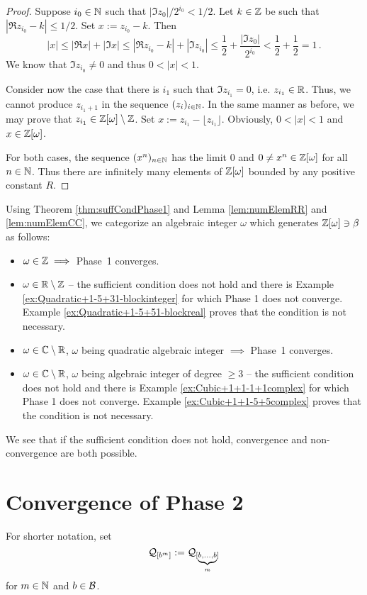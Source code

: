 \begin{proof}
Suppose $i_0\in\mathbb{N}$ such that $|\Im z_0|/2^{i_0}< 1/2$. Let $k\in\mathbb{Z}$ be such that $|\Re z_{i_0} -k|\leq 1/2$. Set $x:= z_{i_0}-k$. Then
$$
|x|\leq |\Re x| +|\Im x| \leq  |\Re z_{i_0} -k| + |\Im z_{i_0}| \leq \frac{1}{2} + \frac{|\Im z_0|}{2^{i_0}} < \frac{1}{2} +\frac{1}{2}=1\,.
$$
We know that $\Im z_{i_0} \neq 0$ and thus $0<|x|<1$.

Consider now the case that there is ${i_1}$ such that $\Im z_{i_1} = 0$, i.e. $z_{i_1}\in\mathbb{R}$. Thus, we cannot produce $z_{i_1+1}$  in the sequence $(z_i)_{i\in\mathbb{N}}$. In the same manner as before, we may prove that  $z_{i_1} \in \mathbb{Z}[\omega]\setminus \mathbb{Z}$. Set $x:= z_{i_1}- \lfloor z_{i_1} \rfloor$. Obviously, $0<|x|<1$ and $x\in\mathbb{Z}[\omega]$.

For both cases, the sequence $(x^n)_{n\in\mathbb{N}}$ has the limit 0 and $0\neq x^n\in\mathbb{Z}[\omega]$ for all $n\in\mathbb{N}$. Thus there are infinitely many elements of $\mathbb{Z}[\omega]$ bounded by any positive constant $R$. 
\end{proof}


Using Theorem \ref{thm:suffCondPhase1} and Lemma \ref{lem:numElemRR} and \ref{lem:numElemCC}, we categorize an algebraic integer $\omega$ which generates $\mathbb{Z}[\omega] \ni \beta$ as follows:

\begin{itemize}
    \item $\omega \in \mathbb{Z} \implies$ Phase~1 converges.
    \item $\omega \in \mathbb{R}\setminus\mathbb{Z}$ -- the sufficient condition does not hold and there is  Example \ref{ex:Quadratic+1-5+31-blockinteger} for which Phase 1 does not converge.  Example \ref{ex:Quadratic+1-5+51-blockreal} proves that the condition is not necessary.
    \item $\omega \in \mathbb{C}\setminus\mathbb{R}$, $\omega$ being quadratic algebraic integer $\implies$ Phase~1 converges.
    \item $\omega \in \mathbb{C}\setminus\mathbb{R}$, $\omega$ being algebraic integer of degree $\geq 3$ -- the sufficient condition does not hold and there is  Example \ref{ex:Cubic+1+1-1+1complex} for which Phase 1 does not converge. Example \ref{ex:Cubic+1+1-5+5complex} proves that the condition is not necessary.
\end{itemize}
We see that if the sufficient condition does not hold, convergence and non-convergence are both possible.


\newpage
\section{Convergence of Phase 2}
\label{sec:convergencePhase2}
For shorter notation, set 
$$
\mathcal{Q}_{[b^{m}]}:=\mathcal{Q}_{[\underbrace{\scriptstyle b,\dots,b}_m]}
$$ for $m \in \mathbb{N}$ and $b\in\mathcal{B}$.

